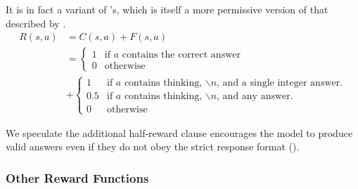 \documentclass{article} %
\theoremstyle{definition}
\begin{document}
It is in fact a variant of \cite{nano-aha-moment}'s, which is itself a more permissive version of that
described by \cite{r1}.
\begin{equation} \label{eq:control-reward-fn}
    \begin{array}{rl}
        R(s, a) &= C(s, a) + F(s, a) \\
        & =\begin{cases}
            1 & \text{if } a \text{ contains the correct answer} \\
            0 & \text{otherwise}
        \end{cases} \\
        & + \begin{cases}
            1 & \text{if } a \text{ contains thinking, $\backslash n$, and a single integer answer.} \\
            0.5 & \text{if } a \text{ contains thinking, $\backslash n$, and any answer.} \\
            0 & \text{otherwise}
        \end{cases}
    \end{array}
\end{equation}

We speculate the additional half-reward clause encourages the model to produce
valid answers even if they do not obey the strict response format (\cite{wk10}).

\subsubsection{Other Reward Functions}
\label{sec:reward-fn-hparams}
\end{document}
